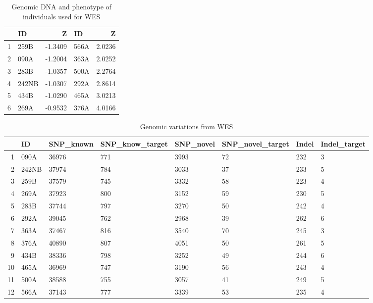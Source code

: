 \documentclass{article}
\begin{document}
\begin{table}[tbp]
\centering
\caption{Genomic DNA and phenotype of individuals used for WES} 
\label{tab:female}
\begin{tabular}{rlrlr}
  \hline
 & ID & Z & ID & Z \\ 
  \hline
1 & 259B & -1.3409 & 566A & 2.0236 \\ 
  2 & 090A & -1.2004 & 363A & 2.0252 \\ 
  3 & 283B & -1.0357 & 500A & 2.2764 \\ 
  4 & 242NB & -1.0307 & 292A & 2.8614 \\ 
  5 & 434B & -1.0290 & 465A & 3.0213 \\ 
  6 & 269A & -0.9532 & 376A & 4.0166 \\ 
   \hline
\end{tabular}
\end{table}
\begin{table}[tbp]
\centering
\caption{Genomic variations from WES} 
\label{tab:whole}
{\small
\begin{tabular}{rlllllll}
  \hline
 & ID & SNP\_known & SNP\_know\_target & SNP\_novel & SNP\_novel\_target & Indel & Indel\_target \\ 
  \hline
1 & 090A & 36976 & 771 & 3993 & 72 & 232 & 3 \\ 
  2 & 242NB & 37974 & 784 & 3033 & 37 & 233 & 5 \\ 
  3 & 259B & 37579 & 745 & 3332 & 58 & 223 & 4 \\ 
  4 & 269A & 37923 & 800 & 3152 & 59 & 230 & 5 \\ 
  5 & 283B & 37744 & 797 & 3270 & 50 & 242 & 4 \\ 
  6 & 292A & 39045 & 762 & 2968 & 39 & 262 & 6 \\ 
  7 & 363A & 37467 & 816 & 3540 & 70 & 245 & 3 \\ 
  8 & 376A & 40890 & 807 & 4051 & 50 & 261 & 5 \\ 
  9 & 434B & 38336 & 798 & 3252 & 49 & 244 & 6 \\ 
  10 & 465A & 36969 & 747 & 3190 & 56 & 243 & 4 \\ 
  11 & 500A & 38588 & 755 & 3057 & 41 & 249 & 5 \\ 
  12 & 566A & 37143 & 777 & 3339 & 53 & 235 & 4 \\ 
   \hline
\end{tabular}
}
\end{table}
\end{document}

